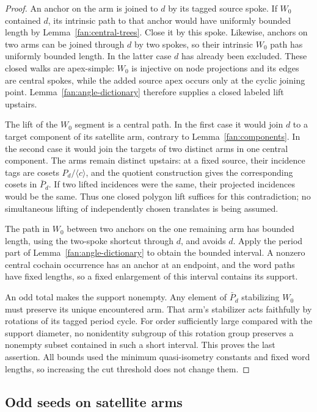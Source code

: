 \begin{proof}
An anchor on the arm is joined to $d$ by its tagged source spoke.
If $W_0$ contained $d$, its intrinsic path to that anchor would have
uniformly bounded length by Lemma~\ref{fan:central-trees}.  Close it
by this spoke.  Likewise, anchors on two arms can be joined through
$d$ by two spokes, so their intrinsic $W_0$ path has uniformly bounded
length.  In the latter case $d$ has already been excluded.  These
closed walks are apex-simple: $W_0$ is injective on node projections
and its edges are central spokes, while the added source apex occurs
only at the cyclic joining point.  Lemma~\ref{fan:angle-dictionary}
therefore supplies a closed labeled lift upstairs.

The lift of the $W_0$ segment is a central path.  In the first case it
would join $d$ to a target component of its satellite arm, contrary to
Lemma~\ref{fan:components}.  In the second case it would join the
targets of two distinct arms in one central component.  The arms
remain distinct upstairs: at a fixed source, their incidence tags
are cosets $P_d/\langle c\rangle$, and the quotient construction gives
the corresponding cosets in $\bar P_d$.  If two lifted incidences
were the same, their projected incidences would be the same.  Thus one
closed polygon lift suffices for this contradiction; no simultaneous
lifting of independently chosen translates is being assumed.

The path in $W_0$ between two anchors on the one remaining arm has
bounded length, using the two-spoke shortcut through $d$, and avoids
$d$.  Apply the period part of Lemma~\ref{fan:angle-dictionary} to
obtain the bounded interval.  A nonzero central cochain occurrence
has an anchor at an endpoint, and the word paths have fixed lengths,
so a fixed enlargement of this interval contains its support.

An odd total makes the support nonempty.  Any element of $\bar P_d$
stabilizing $W_0$ must preserve its unique encountered arm.  That arm's
stabilizer acts faithfully by rotations of its tagged period cycle.
For order sufficiently large compared with the support diameter, no
nonidentity subgroup of this rotation group preserves a nonempty
subset contained in such a short interval.  This proves the last
assertion.  All bounds used the minimum quasi-isometry constants and
fixed word lengths, so increasing the cut threshold does not change
them.
\end{proof}

\subsection{Odd seeds on satellite arms}

